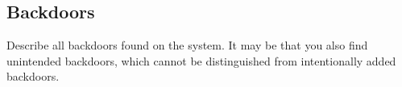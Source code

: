 \subsection{Backdoors}

Describe all backdoors found on the system. 
It may be that you also find unintended backdoors, which cannot be distinguished from intentionally added backdoors.
